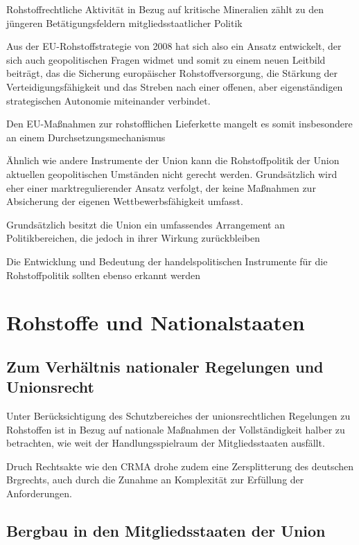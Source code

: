 \documentclass[12pt,a4paper,oneside]{book} %
\begin{document}
Rohstoffrechtliche Aktivität in Bezug auf kritische Mineralien zählt zu den jüngeren Betätigungsfeldern mitgliedsstaatlicher Politik

Aus der EU-Rohstoffstrategie von 2008 hat sich also ein Ansatz entwickelt, der sich auch geopolitischen Fragen widmet und somit zu einem neuen Leitbild beiträgt, das die Sicherung europäischer Rohstoffversorgung, die Stärkung der Verteidigungsfähigkeit und das Streben nach einer offenen, aber eigenständigen strategischen Autonomie miteinander verbindet.\autocite{Handelsblatt Bastian Kullik} 

Den EU-Maßnahmen zur rohstofflichen Lieferkette mangelt es somit insbesondere an einem Durchsetzungsmechanismus

Ähnlich wie andere Instrumente der Union kann die Rohstoffpolitik der Union aktuellen geopolitischen Umständen nicht gerecht werden. Grundsätzlich wird eher einer marktregulierender Ansatz verfolgt, der keine Maßnahmen zur Absicherung der eigenen Wettbewerbsfähigkeit umfasst.

Grundsätzlich besitzt die Union ein umfassendes Arrangement an Politikbereichen, die jedoch in ihrer Wirkung zurückbleiben

Die Entwicklung und Bedeutung der handelspolitischen Instrumente für die Rohstoffpolitik sollten ebenso erkannt werden





\section{Rohstoffe und Nationalstaaten}



\subsection{Zum Verhältnis nationaler Regelungen und Unionsrecht}
Unter Berücksichtigung des Schutzbereiches der unionsrechtlichen Regelungen zu Rohstoffen ist in Bezug auf nationale Maßnahmen der Vollständigkeit halber zu betrachten, wie weit der Handlungsspielraum der Mitgliedsstaaten ausfällt.

Druch Rechtsakte wie den CRMA drohe zudem eine Zersplitterung des deutschen Brgrechts, auch durch die Zunahme an Komplexität zur Erfüllung der Anforderungen.\autocite{NVwZ 2025, 1327}

\subsection{Bergbau in den Mitgliedsstaaten der Union}
\end{document}

